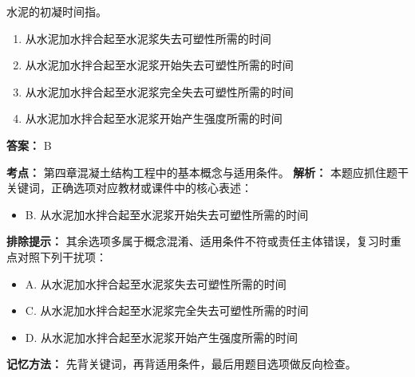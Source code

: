 \documentclass[UTF8,fontset=fandol,11pt]{ctexart}
\begin{document}
\begin{quizbox}[title={第 33 题}]
水泥的初凝时间指。\\
\begin{enumerate}[label=\Alph*.]
\item 从水泥加水拌合起至水泥浆失去可塑性所需的时间
\item 从水泥加水拌合起至水泥浆开始失去可塑性所需的时间
\item 从水泥加水拌合起至水泥浆完全失去可塑性所需的时间
\item 从水泥加水拌合起至水泥浆开始产生强度所需的时间
\end{enumerate}
\textbf{答案：} B
\vspace{0.25em}
\begin{answerbox}[title={考点解析}]
\textbf{考点：} 第四章混凝土结构工程中的基本概念与适用条件。
\textbf{解析：} 本题应抓住题干关键词，正确选项对应教材或课件中的核心表述：
\begin{itemize}
\item B. 从水泥加水拌合起至水泥浆开始失去可塑性所需的时间
\end{itemize}
\textbf{排除提示：} 其余选项多属于概念混淆、适用条件不符或责任主体错误，复习时重点对照下列干扰项：
\begin{itemize}
\item A. 从水泥加水拌合起至水泥浆失去可塑性所需的时间
\item C. 从水泥加水拌合起至水泥浆完全失去可塑性所需的时间
\item D. 从水泥加水拌合起至水泥浆开始产生强度所需的时间
\end{itemize}
\textbf{记忆方法：} 先背关键词，再背适用条件，最后用题目选项做反向检查。
\end{answerbox}
\end{quizbox}
\end{document}
